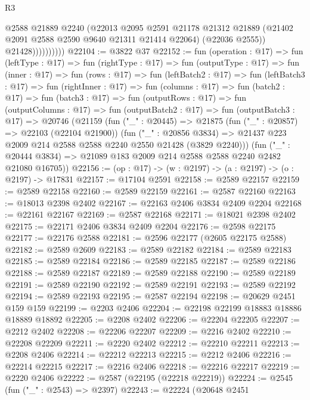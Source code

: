 \begin{lexlean}{R3}
\begin{coremodule}
                        @2588
                        @21889
                        @2240
                        (@22013
                          @2095
                          @2591
                          @21178
                          @21312
                          @21889
                          (@21402 @2091 @2588 @2590 @9640 @21311 @21414 @22064)
                          (@22036 @2555))
                        @21428))))))))))
@22104 := @3822 @37
@22152 := fun (operation : @17) =>
  fun (leftType : @17) =>
  fun (rightType : @17) =>
  fun (outputType : @17) =>
  fun (inner : @17) =>
  fun (rows : @17) =>
  fun (leftBatch2 : @17) =>
  fun (leftBatch3 : @17) =>
  fun (rightInner : @17) =>
  fun (columns : @17) =>
  fun (batch2 : @17) =>
  fun (batch3 : @17) =>
  fun (outputRows : @17) =>
  fun (outputColumns : @17) =>
  fun (outputBatch2 : @17) =>
  fun (outputBatch3 : @17) =>
  @20746
    (@21159
      (fun ("_" : @20445) =>
      @21875
        (fun ("_" : @20857) => @22103 (@22104 @21900))
        (fun ("_" : @20856 @3834) =>
        @21437 @223 @2009 @214 @2588 @2588 @2240 @2550 @21428 (@3829 @2240)))
      (fun ("_" : @20444 @3834) => @21089 @183 @2009 @214 @2588 @2588 @2240 @2482 @21080 @16705))
@22156 := (op : @17) -> (w : @2197) -> (a : @2197) -> (o : @2197) -> @17831
@22157 := @17104 @2591
@22158 := @2589 @22157
@22159 := @2589 @22158
@22160 := @2589 @22159
@22161 := @2587 @22160
@22163 := @18013 @2398 @2402
@22167 := @22163 @2406 @3834 @2409 @2204
@22168 := @22161 @22167
@22169 := @2587 @22168
@22171 := @18021 @2398 @2402
@22175 := @22171 @2406 @3834 @2409 @2204
@22176 := @2598 @22175
@22177 := @22176 @2588
@22181 := @2596 @22177 (@2605 @22175 @2588)
@22182 := @2589 @2609
@22183 := @2589 @22182
@22184 := @2589 @22183
@22185 := @2589 @22184
@22186 := @2589 @22185
@22187 := @2589 @22186
@22188 := @2589 @22187
@22189 := @2589 @22188
@22190 := @2589 @22189
@22191 := @2589 @22190
@22192 := @2589 @22191
@22193 := @2589 @22192
@22194 := @2589 @22193
@22195 := @2587 @22194
@22198 := @20629 @2451 @159 @159
@22199 := @2203 @2406
@22204 := @22198 @22199 @18883 @18886 @18889 @18892
@22205 := @2208 @2402
@22206 := @22204 @22205
@22207 := @2212 @2402
@22208 := @22206 @22207
@22209 := @2216 @2402
@22210 := @22208 @22209
@22211 := @2220 @2402
@22212 := @22210 @22211
@22213 := @2208 @2406
@22214 := @22212 @22213
@22215 := @2212 @2406
@22216 := @22214 @22215
@22217 := @2216 @2406
@22218 := @22216 @22217
@22219 := @2220 @2406
@22222 := @2587 (@22195 (@22218 @22219))
@22224 := @2545 (fun ("_" : @2543) => @2397)
@22243 := @22224
    (@20648
      @2451

\end{coremodule}
\end{lexlean}
